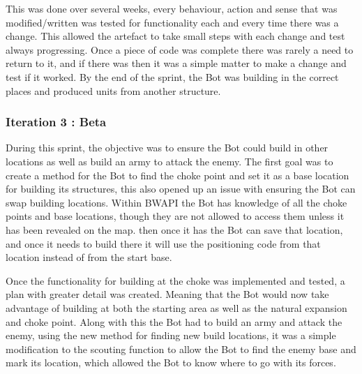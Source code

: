\documentclass[journal]{IEEEtran}
\begin{document}
	This was done over several weeks, every behaviour, action and sense that was modified/written was tested for functionality each and every time there was a change. This allowed the artefact to take small steps with each change and test always progressing. Once a piece of code was complete there was rarely a need to return to it, and if there was then it was a simple matter to make a change and test if it worked. By the end of the sprint, the Bot was building in the correct places and produced units from another structure.
	\newline
	
	\subsubsection{Iteration 3 : Beta}
	During this sprint, the objective was to ensure the Bot could build in other locations as well as build an army to attack the enemy. The first goal was to create a method for the Bot to find the choke point and set it as a base location for building its structures, this also opened up an issue with ensuring the Bot can swap building locations. Within BWAPI the Bot has knowledge of all the choke points and base locations, though they are not allowed to access them unless it has been revealed on the map. then once it has the Bot can save that location, and once it needs to build there it will use the positioning code from that location instead of from the start base. 
	
	Once the functionality for building at the choke was implemented and tested, a plan with greater detail was created. Meaning that the Bot would now take advantage of building at both the starting area as well as the natural expansion and choke point. Along with this the Bot had to build an army and attack the enemy, using the new method for finding new build locations, it was a simple modification to the scouting function to allow the Bot to find the enemy base and mark its location, which allowed the Bot to know where to go with its forces.
	\newline
	
\end{document}
